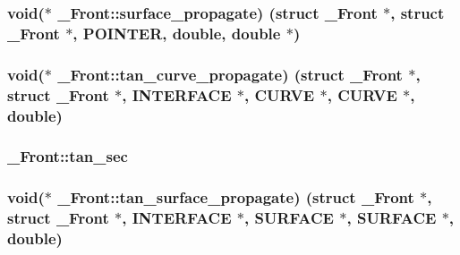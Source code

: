 \subsubsection[{\texorpdfstring{surface\+\_\+propagate}{surface_propagate}}]{\setlength{\rightskip}{0pt plus 5cm}void($\ast$ \+\_\+\+Front\+::surface\+\_\+propagate) (struct {\bf \+\_\+\+Front} $\ast$, struct {\bf \+\_\+\+Front} $\ast$, {\bf P\+O\+I\+N\+T\+ER}, double, double $\ast$)}\hypertarget{struct___front_a601a0a2e0085b77301f642c167e620f3}{}\label{struct___front_a601a0a2e0085b77301f642c167e620f3}
\subsubsection[{\texorpdfstring{tan\+\_\+curve\+\_\+propagate}{tan_curve_propagate}}]{\setlength{\rightskip}{0pt plus 5cm}void($\ast$ \+\_\+\+Front\+::tan\+\_\+curve\+\_\+propagate) (struct {\bf \+\_\+\+Front} $\ast$, struct {\bf \+\_\+\+Front} $\ast$, {\bf I\+N\+T\+E\+R\+F\+A\+CE} $\ast$, {\bf C\+U\+R\+VE} $\ast$, {\bf C\+U\+R\+VE} $\ast$, double)}\hypertarget{struct___front_a920b52cf8787c046e04477a2ea696b1e}{}\label{struct___front_a920b52cf8787c046e04477a2ea696b1e}
\subsubsection[{\texorpdfstring{tan\+\_\+sec}{tan_sec}}]{ \+\_\+\+Front\+::tan\+\_\+sec}\hypertarget{struct___front_a344123b44867c5ed5f897f63e8ccee6a}{}\label{struct___front_a344123b44867c5ed5f897f63e8ccee6a}
\subsubsection[{\texorpdfstring{tan\+\_\+surface\+\_\+propagate}{tan_surface_propagate}}]{\setlength{\rightskip}{0pt plus 5cm}void($\ast$ \+\_\+\+Front\+::tan\+\_\+surface\+\_\+propagate) (struct {\bf \+\_\+\+Front} $\ast$, struct {\bf \+\_\+\+Front} $\ast$, {\bf I\+N\+T\+E\+R\+F\+A\+CE} $\ast$, {\bf S\+U\+R\+F\+A\+CE} $\ast$, {\bf S\+U\+R\+F\+A\+CE} $\ast$, double)}\hypertarget{struct___front_a35c5c3dfdd40c1d1675eb9b919c066cb}{}\label{struct___front_a35c5c3dfdd40c1d1675eb9b919c066cb}
